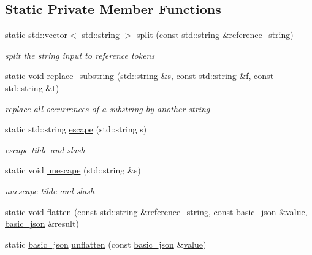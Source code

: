 \subsection*{Static Private Member Functions}
\begin{DoxyCompactItemize}
\item 
static std\+::vector$<$ std\+::string $>$ \hyperlink{classnlohmann_1_1basic__json_1_1json__pointer_a87258899fbf7b9d8b4effe28e4d88e04}{split} (const std\+::string \&reference\+\_\+string)
\begin{DoxyCompactList}\small\item\em split the string input to reference tokens \end{DoxyCompactList}\item 
static void \hyperlink{classnlohmann_1_1basic__json_1_1json__pointer_a414bce1ecc972c4f036f6edd021c70cf}{replace\+\_\+substring} (std\+::string \&s, const std\+::string \&f, const std\+::string \&t)
\begin{DoxyCompactList}\small\item\em replace all occurrences of a substring by another string \end{DoxyCompactList}\item 
static std\+::string \hyperlink{classnlohmann_1_1basic__json_1_1json__pointer_aaa37857c1f355ad1f67ffe76215897ed}{escape} (std\+::string s)
\begin{DoxyCompactList}\small\item\em escape tilde and slash \end{DoxyCompactList}\item 
static void \hyperlink{classnlohmann_1_1basic__json_1_1json__pointer_adfdb6c0cd2a62ff0ee108f2c09d3598b}{unescape} (std\+::string \&s)
\begin{DoxyCompactList}\small\item\em unescape tilde and slash \end{DoxyCompactList}\item 
static void \hyperlink{classnlohmann_1_1basic__json_1_1json__pointer_a1c1baaa26120bac0a5d553eac1dae507}{flatten} (const std\+::string \&reference\+\_\+string, const \hyperlink{classnlohmann_1_1basic__json}{basic\+\_\+json} \&\hyperlink{classnlohmann_1_1basic__json_a0a2cbbd95862a623e7dc5c37e67dead0}{value}, \hyperlink{classnlohmann_1_1basic__json}{basic\+\_\+json} \&result)
\item 
static \hyperlink{classnlohmann_1_1basic__json}{basic\+\_\+json} \hyperlink{classnlohmann_1_1basic__json_1_1json__pointer_a16cb91da82183ec5e87d90b4599591b2}{unflatten} (const \hyperlink{classnlohmann_1_1basic__json}{basic\+\_\+json} \&\hyperlink{classnlohmann_1_1basic__json_a0a2cbbd95862a623e7dc5c37e67dead0}{value})
\end{DoxyCompactItemize}
